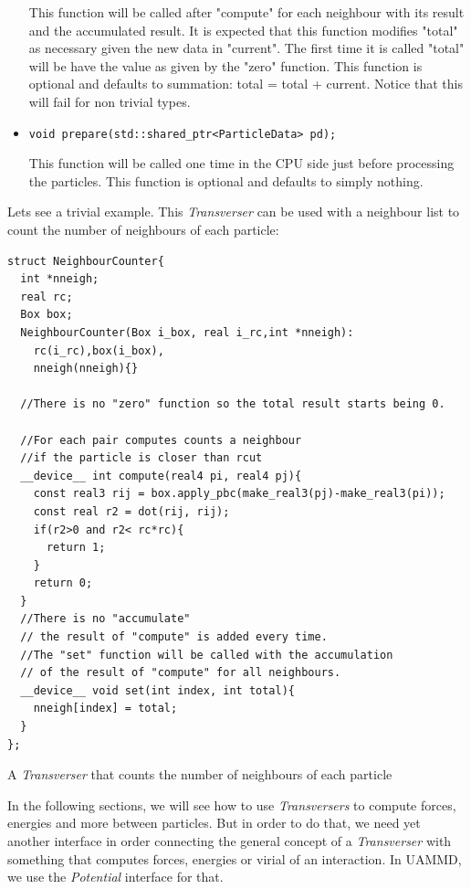 \documentclass[ twoside,openright,titlepage,numbers=noenddot,%
headinclude,footinclude,cleardoublepage=empty,abstract=on,
BCOR=5mm,paper=a4,fontsize=11pt, dvipsnames
]{scrreprt}
\def\ucpp{uammd_cpp_lexer.py:UAMMDCppLexer -x}
\newcommand{\uammd}{\gls{UAMMD}\xspace}
\begin{document}
\begin{itemize}
   
  This function will be called after "compute" for each neighbour with its result and the accumulated result.
  It is expected that this function modifies "total" as necessary given the new data in "current".
  The first time it is called "total" will be have the value as given by the "zero" function.
  This function is optional and defaults to summation: total = total + current. Notice that this will fail for non trivial types.
     
\item \texttt{void prepare(std::shared_ptr<ParticleData> pd);}

  
  This function will be called one time in the CPU side just before processing the particles.
  This function is optional and defaults to simply nothing.
 \end{itemize}

Lets see a trivial example.
This \emph{Transverser} can be used with a neighbour list to count the number of neighbours of each particle:
\begin{listing}
\begin{verbatim}
struct NeighbourCounter{
  int *nneigh;
  real rc;
  Box box;
  NeighbourCounter(Box i_box, real i_rc,int *nneigh):
    rc(i_rc),box(i_box),
    nneigh(nneigh){}

  //There is no "zero" function so the total result starts being 0.
  
  //For each pair computes counts a neighbour 
  //if the particle is closer than rcut
  __device__ int compute(real4 pi, real4 pj){
    const real3 rij = box.apply_pbc(make_real3(pj)-make_real3(pi));
    const real r2 = dot(rij, rij);
    if(r2>0 and r2< rc*rc){
      return 1;
    }
    return 0;
  }
  //There is no "accumulate"
  // the result of "compute" is added every time.
  //The "set" function will be called with the accumulation
  // of the result of "compute" for all neighbours. 
  __device__ void set(int index, int total){
    nneigh[index] = total;
  }
};
\end{verbatim}
\caption{A \emph{Transverser} that counts the number of neighbours of each particle}
\label{code:ncounter}
\end{listing}
In the following sections, we will see how to use \emph{Transversers} to compute forces, energies and more between particles.
But in order to do that, we need yet another interface in order connecting the general concept of a \emph{Transverser} with something that computes forces, energies or virial of an interaction. In \uammd, we use the \emph{Potential} interface for that.
\end{document}
